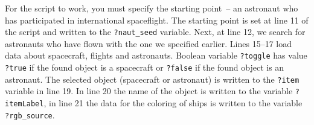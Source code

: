 
For the script to work, you must specify the starting point~-- an astronaut who has participated in international spaceflight. The starting point is set at line 11 of the script and written to the \lstinline{?naut_seed} variable. Next, at line 12, we search for astronauts who have flown with the one we specified earlier. Lines 15--17 load data about spacecraft, flights and astronauts. Boolean variable \lstinline|?toggle| has value \lstinline|?true| if the found object is a spacecraft or \lstinline|?false| if the found object is an astronaut. The selected object (spacecraft or astronaut) is written to the \lstinline|?item| variable in line 19. In line 20 the name of the object is written to the variable \lstinline|?itemLabel|, in line 21 the data for the coloring of ships is written to the variable \lstinline|?rgb_source|. 

